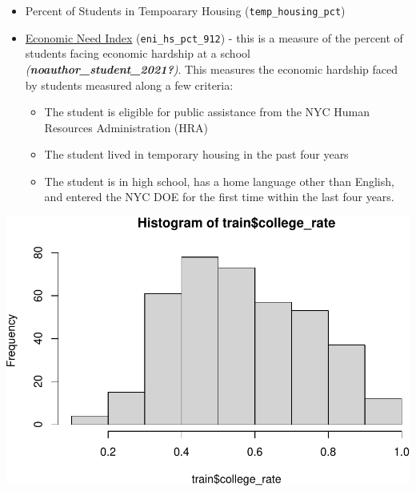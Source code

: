 \documentclass[
  man]{apa6}
\providecommand{\tightlist}{%
  \setlength{\itemsep}{0pt}\setlength{\parskip}{0pt}}
\begin{document}
\begin{itemize}
\tightlist
\item
  Percent of Students in Tempoarary Housing (\texttt{temp\_housing\_pct})
\item
  \href{https://data.cccnewyork.org/data/bar/1371/student-economic-need-index\#1371/a/1/1622/127}{Economic Need Index} (\texttt{eni\_hs\_pct\_912}) - this is a measure of the percent of students facing economic hardship at a school \emph{(\textbf{noauthor\_student\_2021?})}. This measures the economic hardship faced by students measured along a few criteria:

  \begin{itemize}
  \tightlist
  \item
    The student is eligible for public assistance from the NYC Human Resources Administration (HRA)
  \item
    The student lived in temporary housing in the past four years
  \item
    The student is in high school, has a home language other than English, and entered the NYC DOE for the first time within the last four years.
  \end{itemize}
\end{itemize}

\includegraphics{final-project_files/figure-latex/unnamed-chunk-2-1.pdf}
\end{document}
